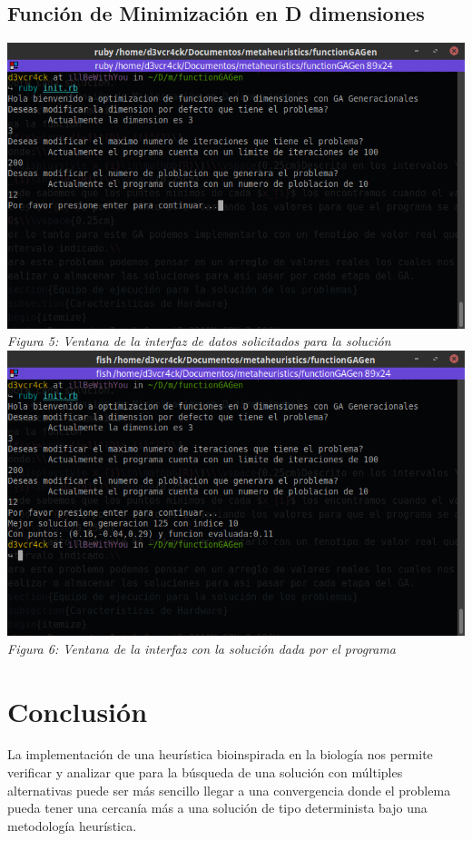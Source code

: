 \documentclass[10pt]{article}
\begin{document}
\subsection{Función de Minimización en D dimensiones}
\begin{center}
  \includegraphics[scale=0.5]{imgs/ventana-func.png}
  \\\textit{Figura 5: Ventana de la interfaz de datos solicitados para la solución}
  \\
  \includegraphics[scale=0.5]{imgs/ventana-func-sol.png}
  \\\textit{Figura 6: Ventana de la interfaz con la solución dada por el programa}
\end{center}
\section{Conclusión}
La implementación de una heurística bioinspirada en la biología nos permite verificar y analizar que para la búsqueda de una solución con múltiples alternativas puede ser más sencillo llegar a una convergencia donde el problema pueda tener una cercanía más a una solución de tipo determinista bajo una metodología heurística.
\end{document}
